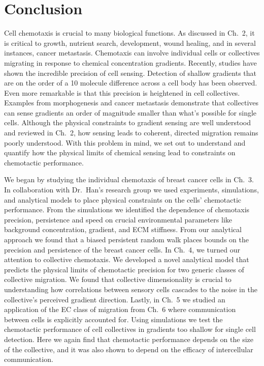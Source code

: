 
\chapter{Conclusion}

\noindent
Cell chemotaxis is crucial to many biological functions. As discussed in Ch.\ 2, it is critical to growth, nutrient search, development, wound healing, and in several instances, cancer metastasis. Chemotaxis can involve individual cells or collectives migrating in response to chemical concentration gradients. Recently, studies have shown the incredible precision of cell sensing. Detection of shallow gradients that are on the order of a 10 molecule difference across a cell body has been observed. Even more remarkable is that this precision is heightened in cell collectives. Examples from morphogenesis and cancer metastasis demonstrate that collectives can sense gradients an order of magnitude smaller than what's possible for single cells. Although the physical constraints to gradient sensing are well understood and reviewed in Ch.\ 2, how sensing leads to coherent, directed migration remains poorly understood. With this problem in mind, we set out to understand and quantify how the physical limits of chemical sensing lead to constraints on chemotactic performance.

We began by studying the individual chemotaxis of breast cancer cells in Ch.\ 3. In collaboration with Dr.\ Han's research group we used experiments, simulations, and analytical models to place physical constraints on the cells' chemotactic performance. From the simulations we identified the dependence of chemotaxis precision, persistence and speed on crucial environmental parameters like background concentration, gradient, and ECM stiffness. From our analytical approach we found that a biased persistent random walk places bounds on the precision and persistence of the breast cancer cells. In Ch.\ 4, we turned our attention to collective chemotaxis. We developed a novel analytical model that predicts the physical limits of chemotactic precision for two generic classes of collective migration. We found that collective dimensionality is crucial to understanding how correlations between sensory cells cascades to the noise in the collective's perceived gradient direction. Lastly, in Ch.\ 5 we studied an application of the EC class of migration from Ch.\ 6 where communication between cells is explicitly accounted for. Using simulations we test the chemotactic performance of cell collectives in gradients too shallow for single cell detection. Here we again find that chemotactic performance depends on the size of the collective, and it was also shown to depend on the efficacy of intercellular communication.

